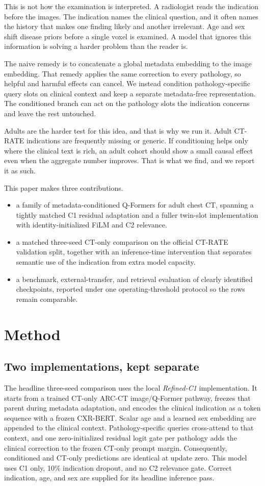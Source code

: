 \documentclass[10pt,twocolumn]{article}
\begin{document}
This is not how the examination is interpreted. A radiologist reads the
indication before the images. The indication names the clinical question, and
it often names the history that makes one finding likely and another
irrelevant. Age and sex shift disease priors before a single voxel is
examined. A model that ignores this information is solving a harder problem
than the reader is.

The naive remedy is to concatenate a global metadata embedding to the image
embedding. That remedy applies the same correction to every pathology, so
helpful and harmful effects can cancel. We instead condition
pathology-specific query slots on clinical context and keep a separate
metadata-free representation. The conditioned branch can act on the pathology
slots the indication concerns and leave the rest untouched.

Adults are the harder test for this idea, and that is why we run it. Adult
CT-RATE indications are frequently missing or generic. If conditioning helps
only where the clinical text is rich, an adult cohort should show a small
causal effect even when the aggregate number improves. That is what we find,
and we report it as such.

This paper makes three contributions.
\begin{itemize}
    \item a family of metadata-conditioned Q-Formers for adult chest CT,
    spanning a tightly matched C1 residual adaptation and a fuller twin-slot
    implementation with identity-initialized FiLM and C2 relevance.
    \item a matched three-seed CT-only comparison on the official CT-RATE
    validation split, together with an inference-time intervention that
    separates semantic use of the indication from extra model capacity.
    \item a benchmark, external-transfer, and retrieval evaluation of clearly
    identified checkpoints, reported under one operating-threshold protocol
    so the rows remain comparable.
\end{itemize}

\section{Method}
\subsection{Two implementations, kept separate}
The headline three-seed comparison uses the local \emph{Refined-C1}
implementation. It starts from a trained CT-only ARC-CT image/Q-Former
pathway, freezes that parent during metadata adaptation, and encodes the
clinical indication as a token sequence with a frozen CXR-BERT. Scalar age
and a learned sex embedding are appended to the clinical context.
Pathology-specific queries cross-attend to that context, and one
zero-initialized residual logit gate per pathology adds the clinical
correction to the frozen CT-only prompt margin. Consequently, conditioned and
CT-only predictions are identical at update zero. This model uses C1 only,
10\% indication dropout, and no C2 relevance gate. Correct indication, age,
and sex are supplied for its headline inference pass.
\end{document}
